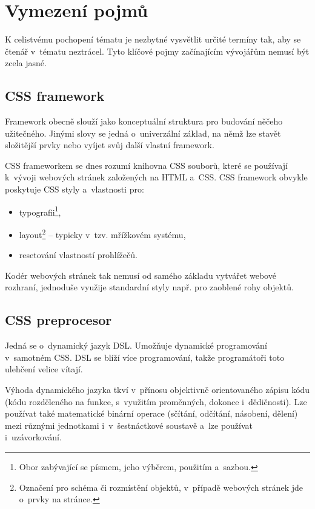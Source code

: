 \documentclass[thesis=B,czech]{FITthesis}[2012/06/26]
\begin{document}
\chapter{Vymezení pojmů}
K celistvému pochopení tématu je nezbytné vysvětlit určité termíny tak, aby se čtenář v~tématu neztrácel. Tyto klíčové pojmy začínajícím vývojářům nemusí být zcela jasné. 


\section{CSS framework}


Framework obecně slouží jako konceptuální struktura pro budování něčeho užitečného. Jinými slovy se jedná o~univerzální základ, na němž lze stavět složitější prvky nebo vyíjet svůj další vlastní framework. 

\gls{CSS} frameworkem se dnes rozumí knihovna \gls{CSS} souborů, které se používají k~vývoji webových stránek založených na \gls{HTML} a~\gls{CSS}. \gls{CSS} framework obvykle poskytuje \gls{CSS} styly a~vlastnosti pro:

\begin{itemize}
 \item typografii\footnote{Obor zabývající se písmem, jeho výběrem, použitím a~sazbou.},
 \item layout\footnote{Označení pro schéma či rozmístění objektů, v~případě webových stránek jde o~prvky na stránce.} -- typicky v~tzv. mřížkovém systému,
 \item resetování vlastností prohlížečů\cite{fram}.
\end{itemize}
Kodér webových stránek tak nemusí od samého základu vytvářet webové rozhraní, jednoduše využije standardní styly např. pro zaoblené rohy objektů. 

\section{CSS preprocesor}

Jedná se o~dynamický jazyk \gls{DSL}. Umožňuje dynamické programování v~samotném \gls{CSS}. \gls{DSL} se blíží více programování, takže programátoři toto ulehčení velice vítají.

Výhoda dynamického jazyka tkví v~přínosu objektivně orientovaného zápisu kódu (kódu rozděleného na funkce, s~využitím proměnných, dokonce i~dědičnosti). Lze používat také matematické binární operace (sčítání, odčítání, násobení, dělení) mezi různými jednotkami i~v~šestnáctkové soustavě a~lze používat i~uzávorkování. 
\end{document}
